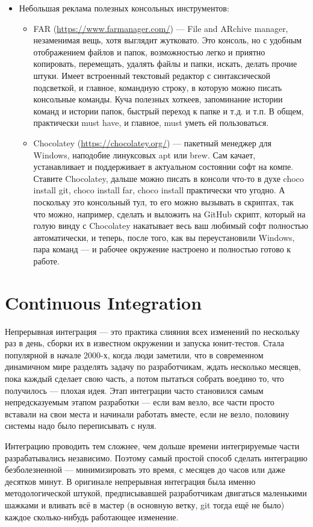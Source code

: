 \documentclass[a5paper]{article}
\begin{document}
\begin{itemize}
	\item Небольшая реклама полезных консольных инструментов:
	\begin{itemize}
		\item FAR (\url{https://www.farmanager.com/}) --- File and ARchive manager, незаменимая вещь, хотя выглядит жутковато. Это консоль, но с удобным отображением файлов и папок, возможностью легко и приятно копировать, перемещать, удалять файлы и папки, искать, делать прочие штуки. Имеет встроенный текстовый редактор с синтаксической подсветкой, и главное, командную строку, в которую можно писать консольные команды. Куча полезных хоткеев, запоминание истории команд и истории папок, быстрый переход к папке и т.д. и т.п. В общем, практически must have, и главное, must уметь ей пользоваться.
		\item Chocolatey (\url{https://chocolatey.org/}) --- пакетный менеджер для Windows, наподобие линуксовых apt или brew. Сам качает, устанавливает и поддерживает в актуальном состоянии софт на компе. Ставите Chocolatey, дальше можно писать в консоли что-то в духе choco install git, choco install far, choco install практически что угодно. А поскольку это консольный тул, то его можно вызывать в скриптах, так что можно, например, сделать и выложить на GitHub скрипт, который на голую винду с Chocolatey накатывает весь ваш любимый софт полностью автоматически, и теперь, после того, как вы переустановили Windows, пара команд --- и рабочее окружение настроено и полностью готово к работе.
	\end{itemize}
\end{itemize}

\section{Continuous Integration}

Непрерывная интеграция --- это практика слияния всех изменений по нескольку раз в день, сборки их в известном окружении и запуска юнит-тестов. Стала популярной в начале 2000-х, когда люди заметили, что в современном динамичном мире разделять задачу по разработчикам, ждать несколько месяцев, пока каждый сделает свою часть, а потом пытаться собрать воедино то, что получилось --- плохая идея. Этап интеграции часто становился самым непредсказуемым этапом разработки --- если вам везло, все части просто вставали на свои места и начинали работать вместе, если не везло, половину системы надо было переписывать с нуля. 

Интеграцию проводить тем сложнее, чем дольше времени интегрируемые части разрабатывались независимо. Поэтому самый простой способ сделать интеграцию безболезненной --- минимизировать это время, с месяцев до часов или даже десятков минут. В оригинале непрерывная интеграция была именно методологической штукой, предписывавшей разработчикам двигаться маленькими шажками и вливать всё в мастер (в основную ветку, git тогда ещё не было) каждое сколько-нибудь работающее изменение.
\end{document}
